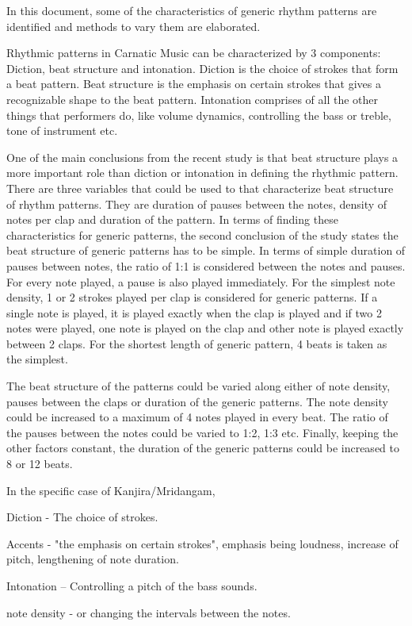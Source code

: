 
In this document, some of the characteristics of generic rhythm patterns are identified and methods to vary them are elaborated.

Rhythmic patterns in Carnatic Music can be characterized by 3 components: Diction, beat structure and intonation. Diction is the choice of strokes that form a beat pattern. Beat structure is the emphasis on certain strokes that gives a recognizable shape to the beat pattern. Intonation comprises of all the other things that performers do, like volume dynamics, controlling the bass or treble, tone of instrument etc. 

One of the main conclusions from the recent study is that beat structure plays a more important role than diction or intonation in defining the rhythmic pattern. There are three variables that could be used to that characterize beat structure of rhythm patterns. They are duration of pauses between the notes, density of notes per clap and duration of the pattern. In terms of finding these characteristics for generic patterns, the second conclusion of the study states the beat structure of generic patterns has to be simple. In terms of simple duration of pauses between notes, the ratio of 1:1 is considered between the notes and pauses. For every note played, a pause is also played immediately. For the simplest note density, 1 or 2 strokes played per clap is considered for generic patterns. If a single note is played, it is played exactly when the clap is played and if two 2 notes were played, one note is played on the clap and other note is played exactly between 2 claps. For the shortest length of generic pattern, 4 beats is taken as the simplest. 

The beat structure of the patterns could be varied along either of note density, pauses between the claps or duration of the generic patterns. The note density could be increased to a maximum of 4 notes played in every beat. The ratio of the pauses between the notes could be varied to 1:2, 1:3 etc. Finally, keeping the other factors constant, the duration of the generic patterns could be increased to 8 or 12 beats.


In the specific case of Kanjira/Mridangam,

Diction - The choice of strokes. 

Accents - "the emphasis on certain strokes", emphasis being loudness, increase of pitch, lengthening of note duration.

Intonation -- Controlling a pitch of the bass sounds.

note density - 
or changing the intervals between the notes.


